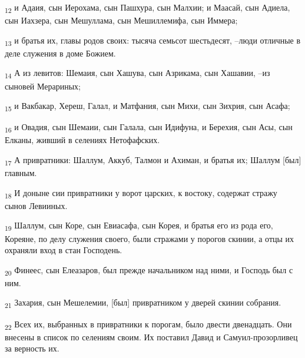 \begin{tcolorbox}
\textsubscript{12} и Адаия, сын Иерохама, сын Пашхура, сын Малхии; и Маасай, сын Адиела, сын Иахзера, сын Мешуллама, сын Мешиллемифа, сын Иммера;
\end{tcolorbox}
\begin{tcolorbox}
\textsubscript{13} и братья их, главы родов своих: тысяча семьсот шестьдесят, --люди отличные в деле служения в доме Божием.
\end{tcolorbox}
\begin{tcolorbox}
\textsubscript{14} А из левитов: Шемаия, сын Хашува, сын Азрикама, сын Хашавии, --из сыновей Мерариных;
\end{tcolorbox}
\begin{tcolorbox}
\textsubscript{15} и Вакбакар, Хереш, Галал, и Матфания, сын Михи, сын Зихрия, сын Асафа;
\end{tcolorbox}
\begin{tcolorbox}
\textsubscript{16} и Овадия, сын Шемаии, сын Галала, сын Идифуна, и Берехия, сын Асы, сын Елканы, живший в селениях Нетофафских.
\end{tcolorbox}
\begin{tcolorbox}
\textsubscript{17} А привратники: Шаллум, Аккуб, Талмон и Ахиман, и братья их; Шаллум [был] главным.
\end{tcolorbox}
\begin{tcolorbox}
\textsubscript{18} И доныне сии привратники у ворот царских, к востоку, содержат стражу сынов Левииных.
\end{tcolorbox}
\begin{tcolorbox}
\textsubscript{19} Шаллум, сын Коре, сын Евиасафа, сын Корея, и братья его из рода его, Кореяне, по делу служения своего, были стражами у порогов скинии, а отцы их охраняли вход в стан Господень.
\end{tcolorbox}
\begin{tcolorbox}
\textsubscript{20} Финеес, сын Елеазаров, был прежде начальником над ними, и Господь был с ним.
\end{tcolorbox}
\begin{tcolorbox}
\textsubscript{21} Захария, сын Мешелемии, [был] привратником у дверей скинии собрания.
\end{tcolorbox}
\begin{tcolorbox}
\textsubscript{22} Всех их, выбранных в привратники к порогам, было двести двенадцать. Они внесены в список по селениям своим. Их поставил Давид и Самуил-прозорливец за верность их.
\end{tcolorbox}

